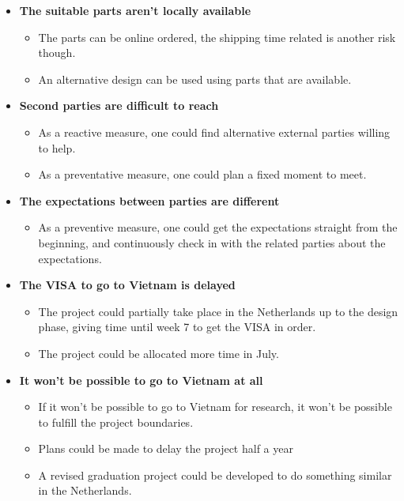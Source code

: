 \documentclass[11pt, a4paper]{article}
\begin{document}
\begin{itemize}
    \item \textbf{The suitable parts aren't locally available}
          \begin{itemize} 
            \item The parts can be online ordered, the shipping time related is another risk though.
            \item An alternative design can be used using parts that are available.
          \end{itemize}
    \item \textbf{Second parties are difficult to reach}
          \begin{itemize} 
            \item As a reactive measure, one could find alternative external parties willing to help.
            \item As a preventative measure, one could plan a fixed moment to meet.
          \end{itemize}
    \item \textbf{The expectations between parties are different}
          \begin{itemize} 
            \item As a preventive measure, one could get the expectations straight from the beginning, and continuously check in with the related parties about the expectations. 
          \end{itemize}
    \item \textbf{The VISA to go to Vietnam is delayed}
          \begin{itemize} 
            \item The project could partially take place in the Netherlands up to the design phase, giving time until week 7 to get the VISA in order.
            \item The project could be allocated more time in July.
          \end{itemize}
    \item \textbf{It won't be possible to go to Vietnam at all}
          \begin{itemize} 
            \item If it won't be possible to go to Vietnam for research, it won't be possible to fulfill the project boundaries.
            \item Plans could be made to delay the project half a year
            \item A revised graduation project could be developed to do something similar in the Netherlands.

\end{itemize}
\end{itemize}
\end{document}
